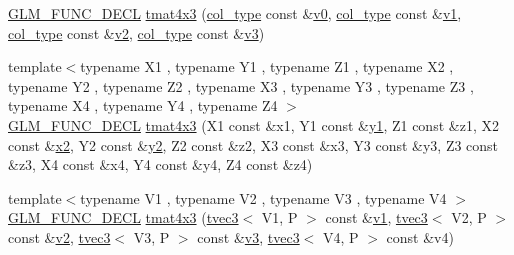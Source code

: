 \begin{DoxyCompactItemize}
\item 
\mbox{\hyperlink{setup_8hpp_ab2d052de21a70539923e9bcbf6e83a51}{G\+L\+M\+\_\+\+F\+U\+N\+C\+\_\+\+D\+E\+CL}} \mbox{\hyperlink{structglm_1_1tmat4x3_acc604d134635bd3f611a8201cacd79c5}{tmat4x3}} (\mbox{\hyperlink{structglm_1_1tmat4x3_ac64f78f27c32014f7d72233969526430}{col\+\_\+type}} const \&\mbox{\hyperlink{glad_8h_a7062a23d1d434121d4a88f530703d06a}{v0}}, \mbox{\hyperlink{structglm_1_1tmat4x3_ac64f78f27c32014f7d72233969526430}{col\+\_\+type}} const \&\mbox{\hyperlink{glad_8h_a0779c3b73f9aa3a0ac5b0139b5d291d9}{v1}}, \mbox{\hyperlink{structglm_1_1tmat4x3_ac64f78f27c32014f7d72233969526430}{col\+\_\+type}} const \&\mbox{\hyperlink{glad_8h_a9a09a1837922b2b806f4589096a52049}{v2}}, \mbox{\hyperlink{structglm_1_1tmat4x3_ac64f78f27c32014f7d72233969526430}{col\+\_\+type}} const \&\mbox{\hyperlink{glad_8h_acc806b31cbf466ceba6555983d8b814d}{v3}})
\item 
{\footnotesize template$<$typename X1 , typename Y1 , typename Z1 , typename X2 , typename Y2 , typename Z2 , typename X3 , typename Y3 , typename Z3 , typename X4 , typename Y4 , typename Z4 $>$ }\\\mbox{\hyperlink{setup_8hpp_ab2d052de21a70539923e9bcbf6e83a51}{G\+L\+M\+\_\+\+F\+U\+N\+C\+\_\+\+D\+E\+CL}} \mbox{\hyperlink{structglm_1_1tmat4x3_a6374ec605f3a745bec999d9dd6926a8d}{tmat4x3}} (X1 const \&x1, Y1 const \&\mbox{\hyperlink{glad_8h_a48340161068d267815ac3131e9d03def}{y1}}, Z1 const \&z1, X2 const \&\mbox{\hyperlink{glad_8h_ad2cea6eadb01f017f0d57e7edf0ce988}{x2}}, Y2 const \&\mbox{\hyperlink{glad_8h_af7158b5d27f7a6aa4ab9973fcc3a5c20}{y2}}, Z2 const \&z2, X3 const \&x3, Y3 const \&y3, Z3 const \&z3, X4 const \&x4, Y4 const \&y4, Z4 const \&z4)
\item 
{\footnotesize template$<$typename V1 , typename V2 , typename V3 , typename V4 $>$ }\\\mbox{\hyperlink{setup_8hpp_ab2d052de21a70539923e9bcbf6e83a51}{G\+L\+M\+\_\+\+F\+U\+N\+C\+\_\+\+D\+E\+CL}} \mbox{\hyperlink{structglm_1_1tmat4x3_a69caec1d2cb2b9320817a1323211d94d}{tmat4x3}} (\mbox{\hyperlink{structglm_1_1tvec3}{tvec3}}$<$ V1, P $>$ const \&\mbox{\hyperlink{glad_8h_a0779c3b73f9aa3a0ac5b0139b5d291d9}{v1}}, \mbox{\hyperlink{structglm_1_1tvec3}{tvec3}}$<$ V2, P $>$ const \&\mbox{\hyperlink{glad_8h_a9a09a1837922b2b806f4589096a52049}{v2}}, \mbox{\hyperlink{structglm_1_1tvec3}{tvec3}}$<$ V3, P $>$ const \&\mbox{\hyperlink{glad_8h_acc806b31cbf466ceba6555983d8b814d}{v3}}, \mbox{\hyperlink{structglm_1_1tvec3}{tvec3}}$<$ V4, P $>$ const \&v4)
\item 

\end{DoxyCompactItemize}
